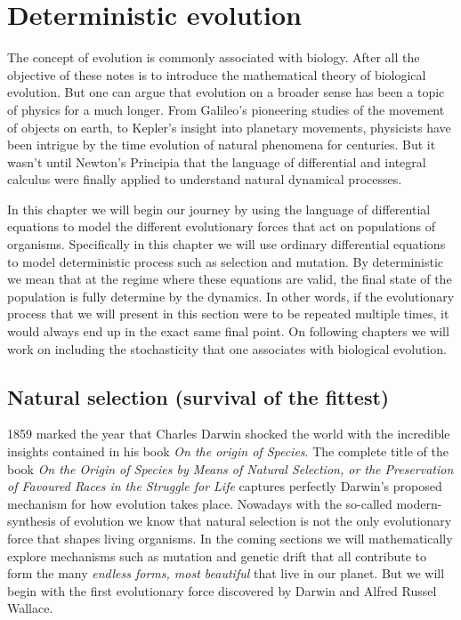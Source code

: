 \section{Deterministic evolution}
The concept of evolution is commonly associated with biology. After all the
objective of these notes is to introduce the mathematical theory of biological
evolution. But one can argue that evolution on a broader sense has been a topic
of physics for a much longer. From Galileo's pioneering studies of the movement
of objects on earth, to Kepler's insight into planetary movements, physicists
have been intrigue by the time evolution of natural phenomena for centuries.
But it wasn't until Newton's Principia that the language of differential and
integral calculus were finally applied to understand natural dynamical processes.

In this chapter we will begin our journey by using the language of differential
equations to model the different evolutionary forces that act on populations of
organisms. Specifically in this chapter we will use ordinary differential
equations to model deterministic process such as selection and mutation. By
deterministic we mean that at the regime where these equations are valid, the
final state of the population is fully determine by the dynamics. In other
words, if the evolutionary process that we will present in this section were to
be repeated multiple times, it would always end up in the exact same final
point. On following chapters we will work on including the stochasticity that
one associates with biological evolution.

\subsection{Natural selection (survival of the fittest)}
\label{sec_selection}
1859 marked the year that Charles Darwin shocked the world with the incredible
insights contained in his book \textit{On the origin of Species}. The complete 
title of the book \textit{On the Origin of Species by Means of Natural
Selection, or the Preservation of Favoured Races in the Struggle for Life}
captures perfectly Darwin's proposed mechanism for how evolution takes place.
Nowadays with the so-called modern-synthesis of evolution we know that natural
selection is not the only evolutionary force that shapes living organisms. In
the coming sections we will mathematically explore mechanisms such as mutation
and genetic drift that all contribute to form the many \textit{endless forms,
most beautiful} that live in our planet. But we will begin with the first
evolutionary force discovered by Darwin and Alfred Russel Wallace.

